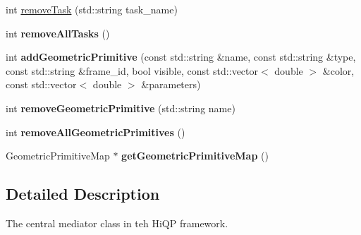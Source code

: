 \begin{DoxyCompactItemize}
\item 
int \hyperlink{classhiqp_1_1TaskManager_a1f58d497fa59e23506e6d7d60fe3693d}{remove\-Task} (std\-::string task\-\_\-name)
\item 
\hypertarget{classhiqp_1_1TaskManager_a929fdbdd83a994ae77177ef27a9f943f}{int {\bfseries remove\-All\-Tasks} ()}\label{classhiqp_1_1TaskManager_a929fdbdd83a994ae77177ef27a9f943f}

\item 
\hypertarget{classhiqp_1_1TaskManager_adaae639bf137e5777698874baf546dc9}{int {\bfseries add\-Geometric\-Primitive} (const std\-::string \&name, const std\-::string \&type, const std\-::string \&frame\-\_\-id, bool visible, const std\-::vector$<$ double $>$ \&color, const std\-::vector$<$ double $>$ \&parameters)}\label{classhiqp_1_1TaskManager_adaae639bf137e5777698874baf546dc9}

\item 
\hypertarget{classhiqp_1_1TaskManager_aa6bdcfaeffc34104e03a552fd8d0edbf}{int {\bfseries remove\-Geometric\-Primitive} (std\-::string name)}\label{classhiqp_1_1TaskManager_aa6bdcfaeffc34104e03a552fd8d0edbf}

\item 
\hypertarget{classhiqp_1_1TaskManager_a39cff5e3787625265ca83b881c7fae84}{int {\bfseries remove\-All\-Geometric\-Primitives} ()}\label{classhiqp_1_1TaskManager_a39cff5e3787625265ca83b881c7fae84}

\item 
\hypertarget{classhiqp_1_1TaskManager_a6218eff8858bd644d58fed63ef29d290}{Geometric\-Primitive\-Map $\ast$ {\bfseries get\-Geometric\-Primitive\-Map} ()}\label{classhiqp_1_1TaskManager_a6218eff8858bd644d58fed63ef29d290}

\end{DoxyCompactItemize}


\subsection{Detailed Description}
The central mediator class in teh Hi\-Q\-P framework. 

